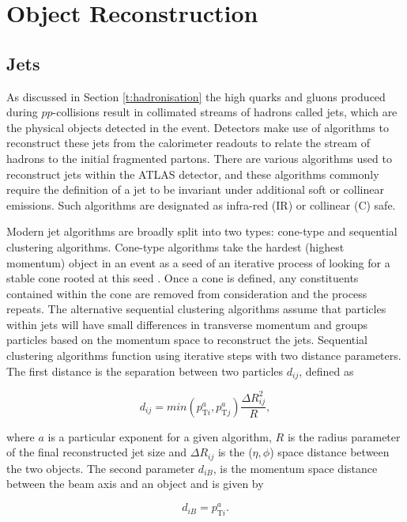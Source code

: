 \section{Object Reconstruction}

	\subsection{Jets}
	\label{d:jetreco}

	As discussed in Section \ref{t:hadronisation} the high \pt quarks and gluons produced during $pp$-collisions result in collimated streams of hadrons called jets, which are the physical objects detected in the event. Detectors make use of algorithms to reconstruct these jets from the calorimeter readouts to relate the stream of hadrons to the initial fragmented partons. There are various algorithms used to reconstruct jets within the ATLAS detector, and these algorithms commonly require the definition of a jet to be invariant under additional soft or collinear emissions. Such algorithms are designated as infra-red (IR) or collinear (C) safe.

	Modern jet algorithms are broadly split into two types: cone-type and sequential clustering algorithms. Cone-type algorithms take the hardest (highest momentum) object in an event as a seed of an iterative process of looking for a stable cone rooted at this seed \cite{cone-type}. Once a cone is defined, any constituents contained within the cone are removed from consideration and the process repeats. The alternative sequential clustering algorithms assume that particles within jets will have small differences in transverse momentum and groups particles based on the momentum space to reconstruct the jets. Sequential clustering algorithms function using iterative steps with two distance parameters. The first distance is the separation between two particles $d_{ij}$, defined as

	\begin{equation}
		d_{ij} = min(p_{\text{T}i}^a, p_{\text{T}j}^a)\frac{\Delta R_{ij}^2}{R},
	\end{equation}

	where $a$ is a particular exponent for a given algorithm, $R$ is the radius parameter of the final reconstructed jet size and $\Delta R_{ij}$ is the ($\eta, \phi$) space distance between the two objects. The second parameter $d_{iB}$, is the momentum space distance between the beam axis and an object \cite{jetreco} and is given by

	\begin{equation}
	d_{iB} = p_{\text{T}i}^a.
	\end{equation}

